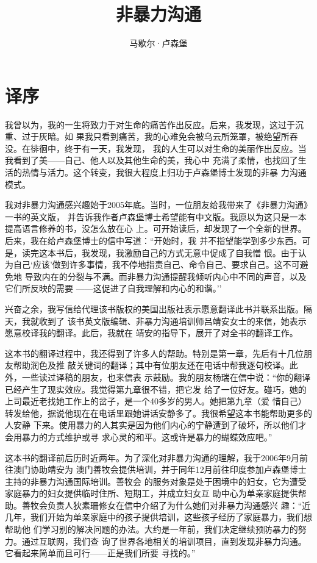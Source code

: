 \documentclass{ctexart}
\title{非暴力沟通}
\author{马歇尔·卢森堡}
\begin{document}
\vspace{-\textheight}


\maketitle
\newpage

\begingroup
{}
\tableofcontents
\endgroup

\newpage

\section*{译序}

我曾以为，我的一生将致力于对生命的痛苦作出反应。后来，我发现，这过于沉重、过于灰暗。如
果我只看到痛苦，我的心难免会被乌云所笼罩，被绝望所吞没。在徘徊中，终于有一天，我发现，
我的人生可以对生命的美丽作出反应。当我看到了美------自己、他人以及其他生命的美，我心中
充满了柔情，也找回了生活的热情与活力。这个转变，我很大程度上归功于卢森堡博士发现的非暴
力沟通模式。

我对非暴力沟通感兴趣始于2005年底。当时，一位朋友给我带来了《非暴力沟通》一书的英文版，
并告诉我作者卢森堡博士希望能有中文版。我原以为这只是一本提高语言修养的书，没怎么放在心
上。可开始读后，却发现了一个全新的世界。后来，我在给卢森堡博士的信中写道：``开始时，我
并不指望能学到多少东西。可是，读完这本书后，我发现，我激励自己的方式无意中促成了自我憎
恨。由于认为自己`应该'做到许多事情，我不停地指责自己、命令自己、要求自己。这不可避免地
导致内在的分裂与不满。而非暴力沟通提醒我倾听内心中不同的声音，以及它们所反映的需要
------这促进了自我理解和内心的和谐。''

兴奋之余，我写信给代理该书版权的美国出版社表示愿意翻译此书并联系出版。隔天，我就收到了
该书英文版编辑、非暴力沟通培训师吕靖安女士的来信，她表示愿意校译我的翻译。此后，我就在
靖安的指导下，展开了对全书的翻译工作。

这本书的翻译过程中，我还得到了许多人的帮助。特别是第一章，先后有十几位朋友帮助润色及推
敲关键词的翻译；其中有位朋友还在电话中帮我逐句校译。此外，一些读过译稿的朋友，也来信表
示鼓励。我的朋友杨瑞在信中说：``你的翻译已经产生了现实效应。我觉得第九章很不错，把它发
给了一位好友。碰巧，她的上司最近老找她工作上的岔子，是一个40多岁的男人。她把第九章（爱
惜自己）转发给他，据说他现在在电话里跟她讲话安静多了。我很希望这本书能帮助更多的人安静
下来。使用暴力的人其实是因为他们内心的宁静遭到了破坏，所以他们才会用暴力的方式维护或寻
求心灵的和平。这或许是暴力的蝴蝶效应吧。''

这本书的翻译前后历时近两年。为了深化对非暴力沟通的理解，我于2006年9月前往澳门协助靖安为
澳门善牧会提供培训，并于同年12月前往印度参加卢森堡博士主持的非暴力沟通国际培训。善牧会
的服务对象是处于困境中的妇女，它为遭受家庭暴力的妇女提供临时住所、短期工，并成立妇女互
助中心为单亲家庭提供帮助。善牧会负责人狄素珊修女在信中介绍了为什么她们对非暴力沟通感兴
趣：``近几年，我们开始为单亲家庭中的孩子提供培训，这些孩子经历了家庭暴力，我们想帮助他
们学习别的解决问题的办法。大约是一年前，我们决定继续预防暴力的努力。通过互联网，我们查
询了世界各地相关的培训项目，直到发现非暴力沟通。它看起来简单而且可行------正是我们所要
寻找的。''
\end{document}

